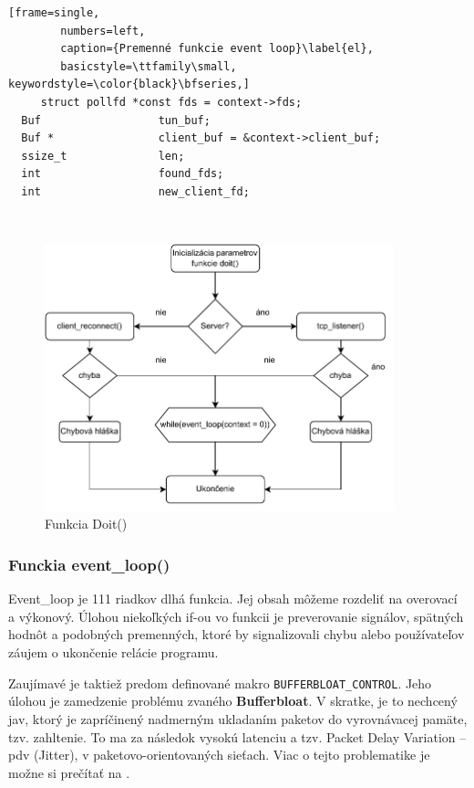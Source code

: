   \begin{minipage}{\linewidth} 	
  	\begin{lstlisting}[frame=single,
  		numbers=left,
  		caption={Premenné funkcie event loop}\label{el},
  		basicstyle=\ttfamily\small, keywordstyle=\color{black}\bfseries,]
     struct pollfd *const fds = context->fds;
  Buf                  tun_buf;
  Buf *                client_buf = &context->client_buf;
  ssize_t              len;
  int                  found_fds;
  int                  new_client_fd;
    	\end{lstlisting}
\end{minipage}\\ 
 
 

\begin{figure}
	\centering
	\includegraphics[width=0.9\textwidth]{figures/fc2}
	\caption{Funkcia Doit()}
	\label{fc2}
\end{figure}

 \subsubsection{Funckia event\_loop()}
 Event\_loop je 111 riadkov dlhá funkcia. Jej obsah môžeme rozdeliť na overovací a výkonový. Úlohou niekoľkých if-ou vo funkcii je preverovanie signálov, spätných hodnôt a podobných premenných, ktoré by signalizovali chybu alebo používateľov záujem o ukončenie relácie programu. 
 
 Zaujímavé je taktiež predom definované makro \lstinline|BUFFERBLOAT_CONTROL|. Jeho úlohou je zamedzenie problému zvaného \textbf{Bufferbloat}. V skratke, je to nechcený jav, ktorý je zapríčinený nadmerným ukladaním paketov do vyrovnávacej pamäte, tzv. zahltenie. To ma za následok vysokú latenciu a tzv. Packet Delay Variation -- \acrshort{pdv} (Jitter), v paketovo-orientovaných sieťach. Viac o tejto problematike je možne si prečítať na \cite{bufferbloat}.
 
